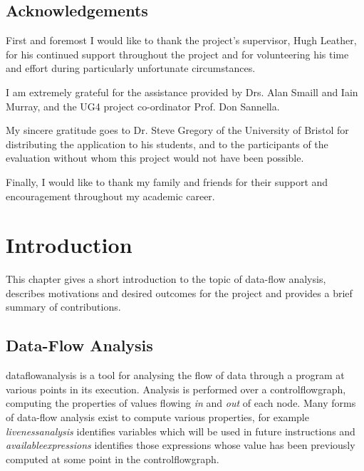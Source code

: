 \documentclass[bsc,twoside,singlespacing,parskip,logo,notimes,normalheadings]{infthesis}
\begin{document}
\maketitle

\section*{Acknowledgements}
First and foremost I would like to thank the project's supervisor,
Hugh Leather, for his continued support throughout the project and for
volunteering his time and effort during particularly unfortunate
circumstances.

I am extremely grateful for the assistance provided by Drs. Alan
Smaill and Iain Murray, and the UG4 project co-ordinator Prof. Don
Sannella.

My sincere gratitude goes to Dr. Steve Gregory of the University of
Bristol for distributing the application to his students, and to the
participants of the evaluation without whom this project would not
have been possible.

Finally, I would like to thank my family and friends for their support
and \break encouragement throughout my academic career.

\tableofcontents

\chapter{Introduction}

This chapter gives a short introduction to the topic of data-flow
analysis, describes motivations and desired outcomes for the project
and provides a brief summary of contributions.


    \section{Data-Flow Analysis}
    \Gls{dataflowanalysis} is a tool for analysing the flow of data
    through a program at various points in its execution. Analysis is
    performed over a \gls{controlflowgraph}, computing the properties
    of values flowing {\em in} and {\em out} of each node. Many forms
    of data-flow analysis exist to compute various properties, for
    example {\em \gls{livenessanalysis}} identifies variables which
    will be used in future instructions and {\em
      \gls{availableexpression}s} identifies those expressions whose
    value has been previously computed at some point in the
    \gls{controlflowgraph}.
    
\end{document}
